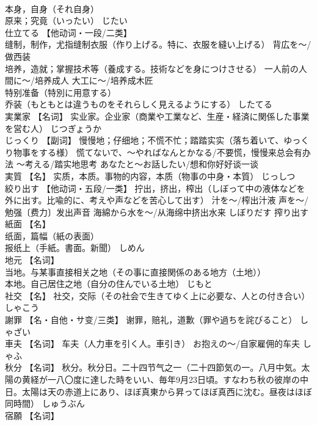 \documentclass[8pt]{extreport}
\begin{document}
\begin{CJK}{UTF8}{min}
\\	本身，自身（それ自身） 
\\	原来；究竟（いったい）	じたい	
\\	仕立てる	【他动词・一段/二类】 
\\	缝制，制作，尤指缝制衣服（作り上げる。特に、衣服を縫い上げる） 背広を～/做西装 
\\	培养，造就；掌握技术等（養成する。技術などを身につけさせる） 一人前の人間に～/培养成人 大工に～/培养成木匠 
\\	特别准备（特別に用意する） 
\\	乔装（もともとは違うものをそれらしく見えるようにする）	したてる	
\\	実業家	【名词】 实业家。企业家（商業や工業など、生産・経済に関係した事業を営む人）	じつぎょうか	
\\	じっくり	【副词】 慢慢地；仔细地；不慌不忙；踏踏实实（落ち着いて、ゆっくり物事をする様） 慌てないで、～やればなんとかなる/不要慌，慢慢来总会有办法 ～考える/踏实地思考 あなたと～お話したい/想和你好好谈一谈		
\\	実質	【名】 实质，本质。事物的内容，本质（物事の中身・本質）	じっしつ	
\\	絞り出す	【他动词・五段/一类】 拧出，挤出，榨出（しぼって中の液体などを外に出す。比喩的に、考えや声などを苦心して出す） 汁を～/榨出汁液 声を～/勉强〔费力〕发出声音 海綿から水を～/从海绵中挤出水来	しぼりだす	搾り出す
\\	紙面	【名】 
\\	纸面，篇幅（紙の表面） 
\\	报纸上（手紙。書面。新聞）	しめん	
\\	地元	【名词】 
\\	当地。与某事直接相关之地（その事に直接関係のある地方（土地）） 
\\	本地。自己居住之地（自分の住んでいる土地）	じもと	
\\	社交	【名】 社交，交际（その社会で生きてゆく上に必要な、人との付き合い）	しゃこう	
\\	謝罪	【名・自他・サ变/三类】 谢罪，赔礼，道歉（罪や過ちを詫びること）	しゃざい	
\\	車夫	【名词】 车夫（人力車を引く人。車引き） お抱えの～/自家雇佣的车夫	しゃふ	
\\	秋分	【名词】 秋分。秋分日。二十四节气之一（二十四節気の一。八月中気。太陽の黄経が一八〇度に達した時をいい、毎年9月23日頃。すなわち秋の彼岸の中日。太陽は天の赤道上にあり、ほぼ真東から昇ってほぼ真西に沈む。昼夜はほぼ同時間）	しゅうぶん	
\\	宿願	【名词】 

\end{CJK}
\end{document}
